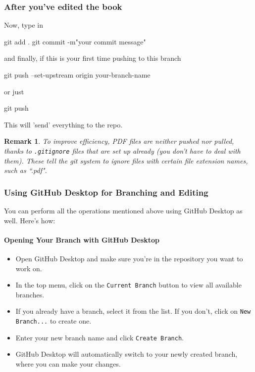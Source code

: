 \documentclass{article}
\newtheorem{remark}{Remark}
\begin{document}
\subsubsection{After you've edited the book}
Now, type in
\begin{bashcode}
    git add .
    git commit -m"your commit message"
\end{bashcode}
and finally, if this is your first time pushing to this branch
\begin{bashcode}
    git push --set-upstream origin your-branch-name
\end{bashcode}
or just 
\begin{bashcode}
    git push
\end{bashcode}
This will 'send' everything to the repo.
\begin{remark}
    To improve efficiency, PDF files are neither pushed nor pulled, thanks to \texttt{.gitignore} files that are set up already (you don't have to deal with them). These tell the git system to ignore files with certain file extension names, such as ``.pdf". 
\end{remark}

\subsubsection{Using GitHub Desktop for Branching and Editing}

You can perform all the operations mentioned above using GitHub Desktop as well. Here's how:

\paragraph{Opening Your Branch with GitHub Desktop}

\begin{itemize}
    \item Open GitHub Desktop and make sure you're in the repository you want to work on.
    \item In the top menu, click on the \texttt{Current Branch} button to view all available branches.
    \item If you already have a branch, select it from the list. If you don't, click on \texttt{New Branch...} to create one.
    \item Enter your new branch name and click \texttt{Create Branch}.
    \item GitHub Desktop will automatically switch to your newly created branch, where you can make your changes.
\end{itemize}
\end{document}
